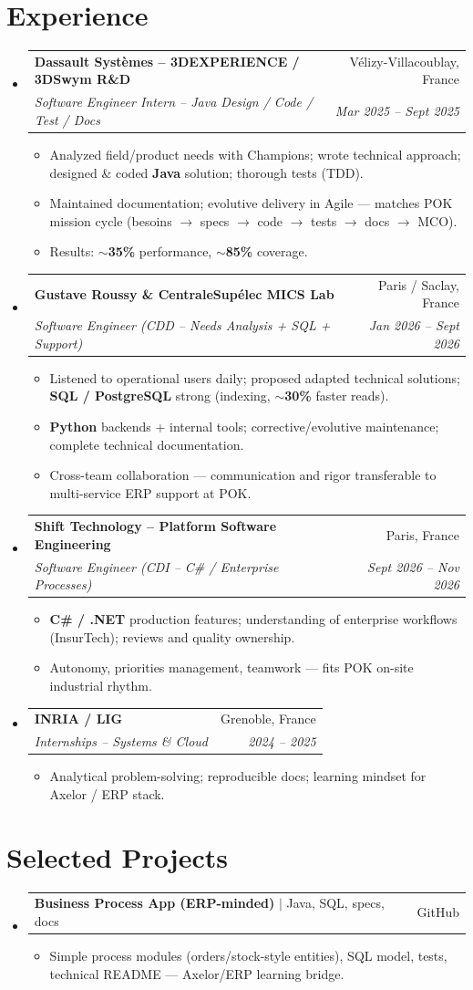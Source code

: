 \documentclass[letterpaper,10.5pt]{article}
\makeatletter
\newcommand{\resumeItem}[1]{\item\small{#1 \vspace{-1.5pt}}}
\newcommand{\resumeSubheading}[4]{\vspace{-1pt}\item\begin{tabular*}{0.97\textwidth}[t]{l@{\extracolsep{\fill}}r}\textbf{#1} & #2 \\\textit{\small#3} & \textit{\small #4} \\\end{tabular*}\vspace{-5pt}}
\newcommand{\resumeProjectHeading}[2]{\item\begin{tabular*}{0.97\textwidth}{l@{\extracolsep{\fill}}r}\small#1 & #2 \\\end{tabular*}\vspace{-5pt}}
\newcommand{\resumeSubHeadingListStart}{\begin{itemize}[leftmargin=0.15in, label={}]}
\newcommand{\resumeSubHeadingListEnd}{\end{itemize}}
\newcommand{\resumeItemListStart}{\begin{itemize}[leftmargin=0.18in]}
\newcommand{\resumeItemListEnd}{\end{itemize}\vspace{-3pt}}
\makeatother
\begin{document}
\section{Experience}
\resumeSubHeadingListStart
  \resumeSubheading
    {Dassault Syst\`emes -- 3DEXPERIENCE / 3DSwym R\&D}{V\'elizy-Villacoublay, France}
    {Software Engineer Intern -- Java Design / Code / Test / Docs}{Mar 2025 -- Sept 2025}
    \resumeItemListStart
      \resumeItem{Analyzed field/product needs with Champions; wrote technical approach; designed \& coded \textbf{Java} solution; thorough tests (TDD).}
      \resumeItem{Maintained documentation; evolutive delivery in Agile --- matches POK mission cycle (besoins $\rightarrow$ specs $\rightarrow$ code $\rightarrow$ tests $\rightarrow$ docs $\rightarrow$ MCO).}
      \resumeItem{Results: \textbf{$\sim$35\%} performance, \textbf{$\sim$85\%} coverage.}
    \resumeItemListEnd
  \resumeSubheading
    {Gustave Roussy \& CentraleSup\'elec MICS Lab}{Paris / Saclay, France}
    {Software Engineer (CDD -- Needs Analysis + SQL + Support)}{Jan 2026 -- Sept 2026}
    \resumeItemListStart
      \resumeItem{Listened to operational users daily; proposed adapted technical solutions; \textbf{SQL / PostgreSQL} strong (indexing, \textbf{$\sim$30\%} faster reads).}
      \resumeItem{\textbf{Python} backends + internal tools; corrective/evolutive maintenance; complete technical documentation.}
      \resumeItem{Cross-team collaboration --- communication and rigor transferable to multi-service ERP support at POK.}
    \resumeItemListEnd
  \resumeSubheading
    {Shift Technology -- Platform Software Engineering}{Paris, France}
    {Software Engineer (CDI -- C\# / Enterprise Processes)}{Sept 2026 -- Nov 2026}
    \resumeItemListStart
      \resumeItem{\textbf{C\# / .NET} production features; understanding of enterprise workflows (InsurTech); reviews and quality ownership.}
      \resumeItem{Autonomy, priorities management, teamwork --- fits POK on-site industrial rhythm.}
    \resumeItemListEnd
  \resumeSubheading
    {INRIA / LIG}{Grenoble, France}
    {Internships -- Systems \& Cloud}{2024 -- 2025}
    \resumeItemListStart
      \resumeItem{Analytical problem-solving; reproducible docs; learning mindset for Axelor / ERP stack.}
    \resumeItemListEnd
\resumeSubHeadingListEnd
\section{Selected Projects}
\resumeSubHeadingListStart
  \resumeProjectHeading{\textbf{Business Process App (ERP-minded)} $|$ Java, SQL, specs, docs}{GitHub}
    \resumeItemListStart
      \resumeItem{Simple process modules (orders/stock-style entities), SQL model, tests, technical README --- Axelor/ERP learning bridge.}
    \resumeItemListEnd
\resumeSubHeadingListEnd
\end{document}
